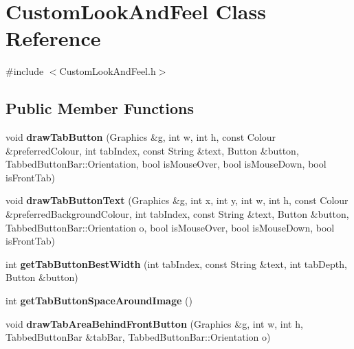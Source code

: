 \hypertarget{classCustomLookAndFeel}{\section{Custom\-Look\-And\-Feel Class Reference}
\label{classCustomLookAndFeel}
}


{\ttfamily \#include $<$Custom\-Look\-And\-Feel.\-h$>$}

\subsection*{Public Member Functions}
\begin{DoxyCompactItemize}
\item 
\hypertarget{classCustomLookAndFeel_a293de1ed51fc12098636c2bb62389a35}{void {\bfseries draw\-Tab\-Button} (Graphics \&g, int w, int h, const Colour \&preferred\-Colour, int tab\-Index, const String \&text, Button \&button, Tabbed\-Button\-Bar\-::\-Orientation, bool is\-Mouse\-Over, bool is\-Mouse\-Down, bool is\-Front\-Tab)}\label{classCustomLookAndFeel_a293de1ed51fc12098636c2bb62389a35}

\item 
\hypertarget{classCustomLookAndFeel_a10e1f39538e5ec8195adf49336fabdc1}{void {\bfseries draw\-Tab\-Button\-Text} (Graphics \&g, int x, int y, int w, int h, const Colour \&preferred\-Background\-Colour, int tab\-Index, const String \&text, Button \&button, Tabbed\-Button\-Bar\-::\-Orientation o, bool is\-Mouse\-Over, bool is\-Mouse\-Down, bool is\-Front\-Tab)}\label{classCustomLookAndFeel_a10e1f39538e5ec8195adf49336fabdc1}

\item 
\hypertarget{classCustomLookAndFeel_a087db189b43e809b93c3004850563157}{int {\bfseries get\-Tab\-Button\-Best\-Width} (int tab\-Index, const String \&text, int tab\-Depth, Button \&button)}\label{classCustomLookAndFeel_a087db189b43e809b93c3004850563157}

\item 
\hypertarget{classCustomLookAndFeel_a1d6fa4575f68909fae463bb1b5f55348}{int {\bfseries get\-Tab\-Button\-Space\-Around\-Image} ()}\label{classCustomLookAndFeel_a1d6fa4575f68909fae463bb1b5f55348}

\item 
\hypertarget{classCustomLookAndFeel_a0dcd1ad0afb18c7cfc72e5c33cc1b27e}{void {\bfseries draw\-Tab\-Area\-Behind\-Front\-Button} (Graphics \&g, int w, int h, Tabbed\-Button\-Bar \&tab\-Bar, Tabbed\-Button\-Bar\-::\-Orientation o)}\label{classCustomLookAndFeel_a0dcd1ad0afb18c7cfc72e5c33cc1b27e}


\end{DoxyCompactItemize}

